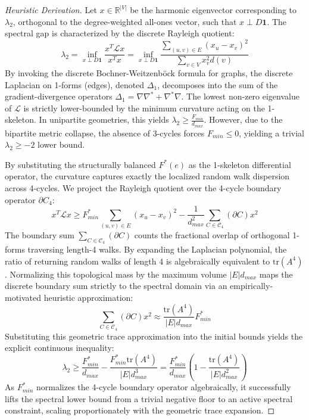 \documentclass{siuro250211}
\begin{document}
\begin{proof}[Heuristic Derivation]
Let $x \in \mathbb{R}^{|V|}$ be the harmonic eigenvector corresponding to $\lambda_2$, orthogonal to the degree-weighted all-ones vector, such that $x \perp D\mathbf{1}$. The spectral gap is characterized by the discrete Rayleigh quotient:
\begin{equation}
\lambda_2 = \inf_{x \perp D\mathbf{1}} \frac{x^T \mathcal{L} x}{x^T x} = \inf_{x \perp D\mathbf{1}} \frac{\sum_{(u,v) \in E} (x_u - x_v)^2}{\sum_{v \in V} x_v^2 d(v)}
\end{equation}
By invoking the discrete Bochner-Weitzenb{\"{o}}ck formula for graphs, the discrete Laplacian on 1-forms (edges), denoted $\Delta_1$, decomposes into the sum of the gradient-divergence operators $\Delta_1 = \nabla \nabla^* + \nabla^* \nabla$. The lowest non-zero eigenvalue of $\mathcal{L}$ is strictly lower-bounded by the minimum curvature acting on the 1-skeleton. In unipartite geometries, this yields $\lambda_2 \ge \frac{F_{min}}{d_{max}}$. However, due to the bipartite metric collapse, the absence of 3-cycles forces $F_{min} \le 0$, yielding a trivial $\lambda_2 \ge -2$ lower bound.

By substituting the structurally balanced $F^*(e)$ as the 1-skeleton differential operator, the curvature captures exactly the localized random walk dispersion across 4-cycles. We project the Rayleigh quotient over the 4-cycle boundary operator $\partial C_4$:
\begin{equation}
x^T \mathcal{L} x \ge F_{min}^* \sum_{(u,v) \in E} (x_u - x_v)^2 - \frac{1}{d_{max}^2} \sum_{C \in \mathcal{C}_4} (\partial C) x^2
\end{equation}
The boundary sum $\sum_{C \in \mathcal{C}_4} (\partial C)$ counts the fractional overlap of orthogonal 1-forms traversing length-4 walks. By expanding the Laplacian polynomial, the ratio of returning random walks of length 4 is algebraically equivalent to $\text{tr}(A^4)$. Normalizing this topological mass by the maximum volume $|E|d_{max}$ maps the discrete boundary sum strictly to the spectral domain via an empirically-motivated heuristic approximation:
\begin{equation}
\sum_{C \in \mathcal{C}_4} (\partial C) x^2 \approx \frac{\text{tr}(A^4)}{|E| d_{max}} F_{min}^*
\end{equation}
Substituting this geometric trace approximation into the initial bounds yields the explicit continuous inequality:
\begin{equation}
\lambda_2 \ge \frac{F_{min}^*}{d_{max}} - \frac{F_{min}^* \text{tr}(A^4)}{|E| d_{max}^3} = \frac{F_{min}^*}{d_{max}} \left( 1 - \frac{\text{tr}(A^4)}{|E| d_{max}^2} \right)
\end{equation}
As $F_{min}^*$ normalizes the 4-cycle boundary operator algebraically, it successfully lifts the spectral lower bound from a trivial negative floor to an active spectral constraint, scaling proportionately with the geometric trace expansion.
\end{proof}
\end{document}
